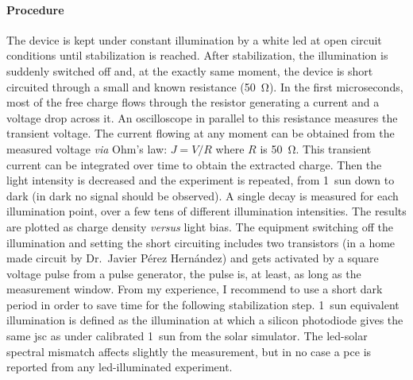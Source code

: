 \paragraph{Procedure}
The device is kept under constant illumination by a white \gls{led} at open circuit conditions until stabilization is reached.
After stabilization, the illumination is suddenly switched off and, at the exactly same moment, the device is short circuited through a small and known resistance (\SI{50}{\ohm}).
In the first microseconds, most of the free charge flows through the resistor generating a current and a voltage drop across it.
An oscilloscope in parallel to this resistance measures the transient voltage.
The current flowing at any moment can be obtained from the measured voltage \textsl{via} Ohm's law: $J=V/R$ where $R$ is \SI{50}{\ohm}.
This transient current can be integrated over time to obtain the extracted charge.
Then the light intensity is decreased and the experiment is repeated, from 1~sun down to dark (in dark no signal should be observed).
A single decay is measured for each illumination point, over a few tens of different illumination intensities.
The results are plotted as charge density \textsl{versus} light bias.
The equipment switching off the illumination and setting the short circuiting includes two transistors (in a home made circuit by Dr.\ Javier Pérez Hernández) and gets activated by a square voltage pulse from a pulse generator, the pulse is, at least, as long as the measurement window.
From my experience, I recommend to use a short dark period in order to save time for the following stabilization step.
1~sun equivalent illumination is defined as the illumination at which a silicon photodiode gives the same \gls{jsc} as under calibrated 1~sun from the solar simulator.
The \gls{led}-solar spectral mismatch affects slightly the measurement, but in no case a \gls{pce} is reported from any \gls{led}-illuminated experiment.

